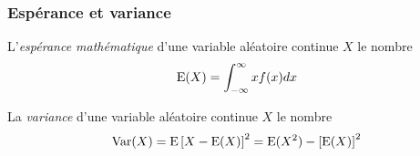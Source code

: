 \subsubsection{Esp\'erance et variance}

\begin{defi}
L'\emph{esp\'erance math\'ematique} d'une variable al\'eatoire continue $X$ le nombre
$${\rm E}(X)=\int^{\infty}_{-\infty} x f(x) dx$$
\end{defi}

\begin{defi}
La \emph{variance} d'une variable al\'eatoire continue $X$ le nombre
$$\operatorname{Var}(X)={\rm E}\left[ X-{\rm E}(X)\right]^2 = {\rm E}(X^2)-\left[ {\rm E}(X)\right]^2$$
\end{defi}
